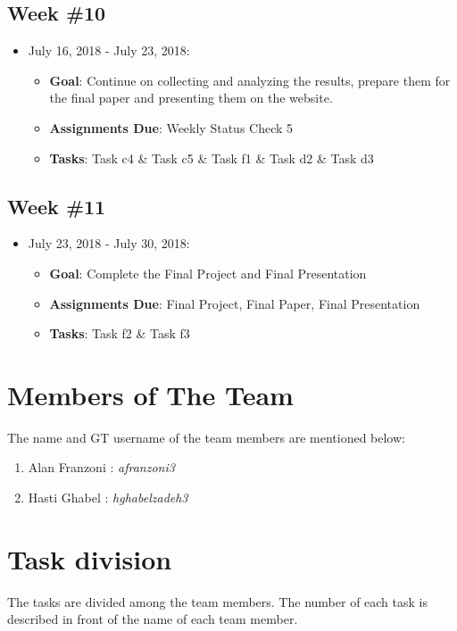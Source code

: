 \documentclass{sigchi}
\begin{document}
 \subsection{Week \#10}
\begin{itemize}
 	\item July 16, 2018 - July 23, 2018:
	\begin{itemize}
 		\item \textbf{Goal}: Continue on collecting and analyzing the results, prepare them for the final paper and presenting them on the website. 
 		\item \textbf{Assignments Due}: Weekly Status Check 5
 		\item \textbf{Tasks}: Task c4 \& Task c5  \& Task f1 \& Task d2 \& Task d3
	\end{itemize} 
 \end{itemize} 
 
 \subsection{Week \#11}
\begin{itemize}
 	\item July 23, 2018 - July 30, 2018:
	\begin{itemize}
 		\item \textbf{Goal}: Complete the Final Project and Final Presentation
 		\item \textbf{Assignments Due}: Final Project, Final Paper, Final Presentation
 		\item \textbf{Tasks}: Task f2 \& Task f3
	\end{itemize} 
 \end{itemize} 


\section{Members of The Team}
The name and GT username of the team members are mentioned below:
 
\begin{enumerate}
	\item Alan Franzoni : \textit{afranzoni3}
	\item Hasti Ghabel : \textit{hghabelzadeh3}
\end{enumerate}


\section{Task division}
The tasks are divided among the team members. The number of each task is described in front of the name of each team member.
 
\end{document}
